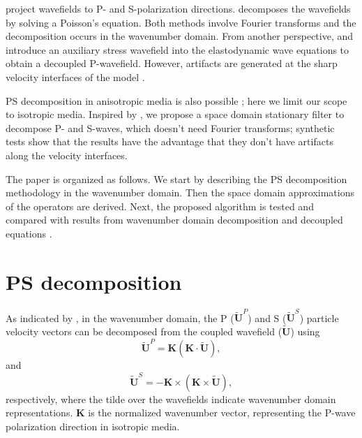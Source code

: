 \documentclass[manuscript,ulem,graphix,revised]{geophysics}
\begin{document}
\citet{zhang10} project wavefields to P- and S-polarization directions. \citet{zhu17} decomposes the wavefields by solving a Poisson's equation. Both methods involve Fourier transforms and the decomposition occurs in the wavenumber domain. From another perspective, \citet{ma03} and \citet{wenlong_vct15} introduce an auxiliary stress wavefield into the elastodynamic wave equations \citep{virieux84} to obtain a decoupled P-wavefield. However, artifacts are generated at the sharp velocity interfaces of the model \citep{wenlong_cmp15}. 

PS decomposition in anisotropic media is also possible \citep{zhang10, cheng14, wenlong18}; here we limit our scope to isotropic media. Inspired by \citet{yan09}, we propose a space domain stationary filter to decompose P- and S-waves, which doesn't need Fourier transforms; synthetic tests show that the results have the advantage that they don't have artifacts along the velocity interfaces.

The paper is organized as follows. We start by describing the PS decomposition methodology in the wavenumber domain. Then the space domain approximations of the operators are derived. Next, the proposed algorithm is tested and compared with results from wavenumber domain decomposition \citep{zhang10} and decoupled equations \citep{ma03, wenlong_cmp15}. 



\section{PS decomposition}

As indicated by \citet{zhang10}, in the wavenumber domain, the P ($\tilde{\boldsymbol{U}}^P$) and S ($\tilde{\boldsymbol{U}}^S$) particle velocity vectors can be decomposed from the coupled wavefield ($\tilde{\boldsymbol{U}}$) using
\begin{equation}
\tilde{\boldsymbol{U}}^P = \boldsymbol{K} (\boldsymbol{K} \cdot \tilde{\boldsymbol{U}}),
\label{eqn:p_wave}
\end{equation}
and
\begin{equation}
\tilde{\boldsymbol{U}}^S =-\boldsymbol{K} \times (\boldsymbol{K} \times \tilde{\boldsymbol{U}}),
\label{eqn:p_wave}
\end{equation}
respectively, where the tilde over the wavefields indicate wavenumber domain representations. $\boldsymbol{K}$ is the normalized wavenumber vector, representing the P-wave polarization direction in isotropic media.
\end{document}
